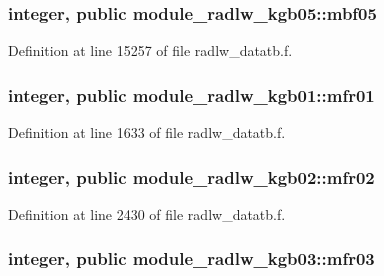 \subsubsection[{\texorpdfstring{mbf05}{mbf05}}]{\setlength{\rightskip}{0pt plus 5cm}integer, public module\+\_\+radlw\+\_\+kgb05\+::mbf05}\hypertarget{group__module__radlw__main_ga57db9a9cb9acac604df555038f6127a3}{}\label{group__module__radlw__main_ga57db9a9cb9acac604df555038f6127a3}


Definition at line 15257 of file radlw\+\_\+datatb.\+f.

\subsubsection[{\texorpdfstring{mfr01}{mfr01}}]{\setlength{\rightskip}{0pt plus 5cm}integer, public module\+\_\+radlw\+\_\+kgb01\+::mfr01}\hypertarget{group__module__radlw__main_ga4bd2e710d96291436f9ee36e99816a19}{}\label{group__module__radlw__main_ga4bd2e710d96291436f9ee36e99816a19}


Definition at line 1633 of file radlw\+\_\+datatb.\+f.

\subsubsection[{\texorpdfstring{mfr02}{mfr02}}]{\setlength{\rightskip}{0pt plus 5cm}integer, public module\+\_\+radlw\+\_\+kgb02\+::mfr02}\hypertarget{group__module__radlw__main_ga2973c2e9220e85b74f0b251c896aa837}{}\label{group__module__radlw__main_ga2973c2e9220e85b74f0b251c896aa837}


Definition at line 2430 of file radlw\+\_\+datatb.\+f.

\subsubsection[{\texorpdfstring{mfr03}{mfr03}}]{\setlength{\rightskip}{0pt plus 5cm}integer, public module\+\_\+radlw\+\_\+kgb03\+::mfr03}\hypertarget{group__module__radlw__main_ga4ea1e58a39585adc087718b92a16b529}{}\label{group__module__radlw__main_ga4ea1e58a39585adc087718b92a16b529}


